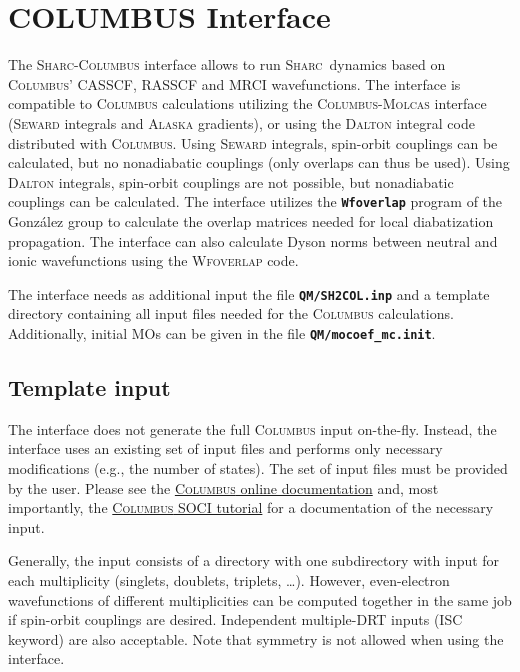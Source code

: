 \documentclass[a4paper,11pt,DIV=15,openany,twoside=false]{scrbook}
\newcommand{\sharc}{\textsc{Sharc}}
\newcommand{\ttt}[1]{\textbf{\texttt{#1}}}
\begin{document}

\section{COLUMBUS Interface}\label{sec:int:columbus}

The \sharc-\textsc{Columbus} interface allows to run \sharc\ dynamics based on \textsc{Columbus}' CASSCF, RASSCF and MRCI wavefunctions. 
The interface is compatible to \textsc{Columbus} calculations utilizing the \textsc{Columbus}-\textsc{Molcas} interface (\textsc{Seward} integrals and \textsc{Alaska} gradients), or using the \textsc{Dalton} integral code distributed with \textsc{Columbus}. 
Using \textsc{Seward} integrals, spin-orbit couplings can be calculated, but no nonadiabatic couplings (only overlaps can thus be used).
Using \textsc{Dalton} integrals, spin-orbit couplings are not possible, but nonadiabatic couplings can be calculated.
The interface utilizes the \ttt{Wfoverlap} program of the Gonz\'alez group\cite{Plasser2016JCTC} to calculate the overlap matrices needed for local diabatization propagation. 
The interface can also calculate Dyson norms between neutral and ionic wavefunctions using the \textsc{Wfoverlap} code.

The interface needs as additional input the file \ttt{QM/SH2COL.inp} and a template directory containing all input files needed for the \textsc{Columbus} calculations. Additionally, initial MOs can be given in the file \ttt{QM/mocoef\_mc.init}.

\subsection{Template input}

The interface does not generate the full \textsc{Columbus} input on-the-fly. Instead, the interface uses an existing set of input files and performs only necessary modifications (e.g., the number of states). The set of input files must be provided by the user. Please see the \href{http://www.univie.ac.at/columbus/docs_COL70/documentation_main.html}{\textsc{Columbus} online documentation} and, most importantly, the 
\href{http://www.univie.ac.at/columbus/docs_COL70/tutorial-SO.pdf}{\textsc{Columbus} SOCI tutorial} for a documentation of the necessary input.

Generally, the input consists of a directory with one subdirectory with input for each multiplicity (singlets, doublets, triplets, \dots). However, even-electron wavefunctions of different multiplicities can be computed together in the same job if spin-orbit couplings are desired. Independent multiple-DRT inputs (ISC keyword) are also acceptable. Note that symmetry is not allowed when using the interface.
\end{document}
